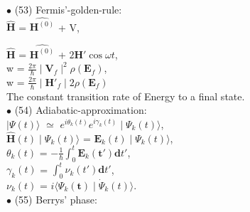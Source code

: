 \documentclass[a4paper, 10pt, onepage]{elegantbook}
\begin{document}
{$\bullet$ (53) Fermis'-golden-rule:  \\

$\hat{\mathbf H}$ = $\hat{\mathbf H^{(0)}}$ + V,

$\hat{\mathbf H}$ = $\hat{\mathbf H^{(0)}}$ + $2 \mathbf H' \cos \omega t$,  \\

w = $\frac{2 \pi}{\hbar} \mid \mathbf V_f \mid^2 \rho(\mathbf E_f)$, \\

w = $\frac{2 \pi}{\hbar} \mid \mathbf H'_f \mid 2 \rho(\mathbf E_f)$  \\

The constant transition rate of Energy to a final state.  \\





$\bullet$ (54) Adiabatic-approximation: \\ 

$\mid \Psi(t) \rangle$ $\simeq$ $e^{i \theta_k(t)} e^{i \gamma_k(t)} \mid \Psi_k(t) \rangle$,  \\  

$\hat{\mathbf H} (t) \mid \Psi_k(t) \rangle$ = $\mathbf E_k(t) \mid \Psi_k(t) \rangle$, \\   

$\theta_k(t)$ = $ -\frac{1}{\hbar} \int_0^t \mathbf E_k(\mathbf t') {\mathbf dt'}$, \\ 

$\gamma_k(t)$ = $\int_0^t \nu_k(t') {\mathbf dt'}$, \\ 

$\nu_k(t)$ = $i \langle  \Psi_k(\mathbf t) \mid {\dot \Psi_k}(t) \rangle$. \\

$\bullet$ (55) Berrys' phase:  \\

}
\end{document}
